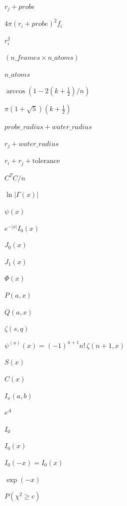 \documentclass{article}
\begin{document}
$r_j + probe$
\pagebreak

$4\pi (r_i + probe)^2 f_i$
\pagebreak

$r_i^2$
\pagebreak

$(n\_frames \times n\_atoms)$
\pagebreak

$n\_atoms$
\pagebreak

$\arccos(1 - 2(k + \tfrac12)/n)$
\pagebreak

$\pi(1 + \sqrt5)(k + \tfrac12)$
\pagebreak

$probe\_radius + water\_radius$
\pagebreak

$r_j + water\_radius$
\pagebreak

$r_i + r_j + \mathrm{tolerance}$
\pagebreak

$C^T C / n$
\pagebreak

$\ln|\Gamma(x)|$
\pagebreak

$\psi(x)$
\pagebreak

$e^{-|x|} I_0(x)$
\pagebreak

$J_0(x)$
\pagebreak

$J_1(x)$
\pagebreak

$\Phi(x)$
\pagebreak

$P(a, x)$
\pagebreak

$Q(a, x)$
\pagebreak

$\zeta(s, q)$
\pagebreak

$\psi^{(n)}(x) = (-1)^{n+1} n!\, \zeta(n+1, x)$
\pagebreak

$S(x)$
\pagebreak

$C(x)$
\pagebreak

$I_x(a, b)$
\pagebreak

$e^{A}$
\pagebreak

$I_0$
\pagebreak

$I_0(x)$
\pagebreak

$I_0(-x) = I_0(x)$
\pagebreak

$\exp(-x)$
\pagebreak

$P(\chi^2 \ge c)$
\pagebreak
\end{document}
